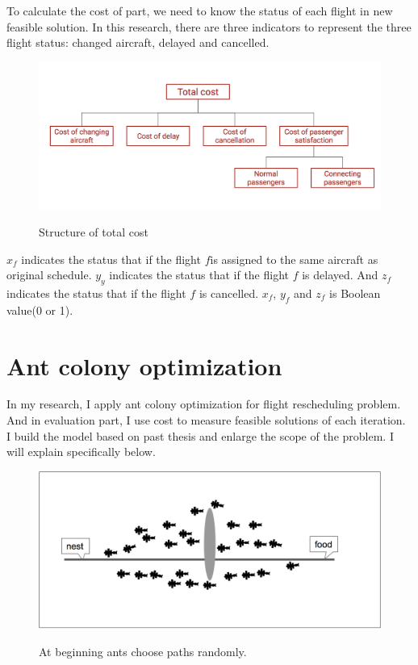 \documentclass[senior]{IPSstyle}
\begin{document}
To calculate the cost of part, we need to know the status of each flight in new feasible solution. 
In this research, there are three indicators to represent the three flight status: changed aircraft, delayed and cancelled. 

\begin{figure}[h]
    \centering
    \includegraphics[width=15cm]{MasterThesis-master/Coststructure.png}\\
    \caption{Structure of total cost}
    \label{fig:coststructure}
\end{figure}

\(x_f\) indicates the status that if the flight \(f\)is assigned to the same aircraft as original schedule. \(y_y\) indicates the status that if the flight \(f\) is delayed. And \(z_f\) indicates the status that if the flight \(f\) is cancelled. \(x_f\), \(y_f\) and \(z_f\) is Boolean value(0 or 1).
\section{Ant colony optimization} \label{Ant colony optimization}

In my research, I apply ant colony optimization for flight rescheduling problem. And in evaluation part, I use cost to measure feasible solutions of each iteration. I build the model based on past thesis\cite{sousa2015airline} and enlarge the scope of the problem. I will explain specifically below. 

\begin{figure}[h]
  \centering
  \includegraphics[width=15cm]{MasterThesis-master/ACO-1.png}\\
  \caption{At beginning ants choose paths randomly.}\label{fig: aco1}
\end{figure}
\end{document}
